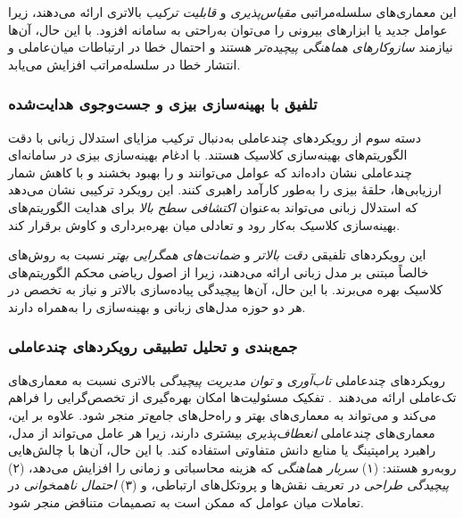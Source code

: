 این معماری‌های سلسله‌مراتبی \emph{مقیاس‌پذیری} و \emph{قابلیت ترکیب} بالاتری ارائه می‌دهند، زیرا عوامل جدید یا ابزارهای بیرونی را می‌توان به‌راحتی به سامانه افزود. با این حال، آن‌ها نیازمند \emph{سازوکارهای هماهنگی پیچیده‌تر} هستند و احتمال خطا در ارتباطات میان‌عاملی و انتشار خطا در سلسله‌مراتب افزایش می‌یابد.

\subsubsection{تلفیق با بهینه‌سازی بیزی و جست‌وجوی هدایت‌شده}
دسته سوم از رویکردهای چندعاملی به‌دنبال ترکیب مزایای استدلال زبانی با دقت الگوریتم‌های بهینه‌سازی کلاسیک هستند. \cite{liu2024LLAMBO} با ادغام بهینه‌سازی بیزی در سامانه‌ای چندعاملی نشان داده‌اند که عوامل می‌توانند  و  را بهبود بخشند و با کاهش شمار ارزیابی‌ها، حلقهٔ بیزی را به‌طور کارآمد راهبری کنند. این رویکرد ترکیبی نشان می‌دهد که استدلال زبانی می‌تواند به‌عنوان \emph{اکتشافی سطح بالا} برای هدایت الگوریتم‌های بهینه‌سازی کلاسیک به‌کار رود و تعادلی میان بهره‌برداری و کاوش برقرار کند.

این رویکردهای تلفیقی \emph{دقت بالاتر} و \emph{ضمانت‌های همگرایی بهتر} نسبت به روش‌های خالصاً مبتنی بر مدل زبانی ارائه می‌دهند، زیرا از اصول ریاضی محکم الگوریتم‌های کلاسیک بهره می‌برند. با این حال، آن‌ها پیچیدگی پیاده‌سازی بالاتر و نیاز به تخصص در هر دو حوزه مدل‌های زبانی و بهینه‌سازی را به‌همراه دارند.

\subsubsection{جمع‌بندی و تحلیل تطبیقی رویکردهای چندعاملی}
رویکردهای چندعاملی \emph{تاب‌آوری} و \emph{توان مدیریت پیچیدگی} بالاتری نسبت به معماری‌های تک‌عاملی ارائه می‌دهند~\cite{xu2024largeTextToML,trirat2025automlagent,liu2024LLAMBO}. تفکیک مسئولیت‌ها امکان بهره‌گیری از تخصص‌گرایی را فراهم می‌کند و می‌تواند به معماری‌های بهتر و راه‌حل‌های جامع‌تر منجر شود. علاوه بر این، معماری‌های چندعاملی \emph{انعطاف‌پذیری} بیشتری دارند، زیرا هر عامل می‌تواند از مدل، راهبرد پرامپتینگ یا منابع دانش متفاوتی استفاده کند. با این حال، آن‌ها با چالش‌هایی روبه‌رو هستند: (۱) \emph{سربار هماهنگی} که هزینه محاسباتی و زمانی را افزایش می‌دهد، (۲) \emph{پیچیدگی طراحی} در تعریف نقش‌ها و پروتکل‌های ارتباطی، و (۳) \emph{احتمال ناهمخوانی} در تعاملات میان عوامل که ممکن است به تصمیمات متناقض منجر شود.

